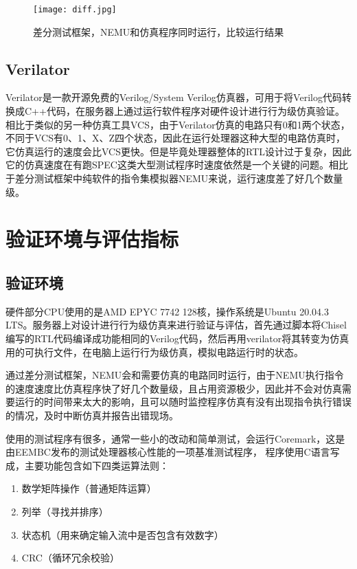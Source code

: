 \begin{figure}[htb]
	\centering
	\setlength\tabcolsep{3pt}  %
	\vspace{5pt} %
	\texttt{[image: diff.jpg]}
	\caption{差分测试框架，NEMU和仿真程序同时运行，比较运行结果}
	\label{fig:figure64}
\end{figure}

\subsection{Verilator}

Verilator\cite{verilator}是一款开源免费的Verilog/System Verilog仿真器，可用于将Verilog代码转换成C++代码，在服务器上通过运行软件程序对硬件设计进行行为级仿真验证。相比于类似的另一种仿真工具VCS\cite{vcs}，由于Verilator仿真的电路只有0和1两个状态，不同于VCS有0、1、X、Z四个状态，因此在运行处理器这种大型的电路仿真时，它仿真运行的速度会比VCS更快。但是毕竟处理器整体的RTL设计过于复杂，因此它的仿真速度在有跑SPEC这类大型测试程序时速度依然是一个关键的问题。相比于差分测试框架中纯软件的指令集模拟器NEMU来说，运行速度差了好几个数量级。

\section{验证环境与评估指标}

\subsection{验证环境}

硬件部分CPU使用的是AMD EPYC 7742 128核，操作系统是Ubuntu 20.04.3 LTS。服务器上对设计进行行为级仿真来进行验证与评估，首先通过脚本将Chisel编写的RTL代码编译成功能相同的Verilog代码，然后再用verilator将其转变为仿真用的可执行文件，在电脑上运行行为级仿真，模拟电路运行时的状态。

通过差分测试框架，NEMU会和需要仿真的电路同时运行，由于NEMU执行指令的速度速度比仿真程序快了好几个数量级，且占用资源极少，因此并不会对仿真需要运行的时间带来太大的影响，且可以随时监控程序仿真有没有出现指令执行错误的情况，及时中断仿真并报告出错现场。

使用的测试程序有很多，通常一些小的改动和简单测试，会运行Coremark，这是由EEMBC发布的测试处理器核心性能的一项基准测试程序，
程序使用C语言写成，主要功能包含如下四类运算法则：

\begin{enumerate}
	\item 数学矩阵操作（普通矩阵运算）
	\item 列举（寻找并排序）
	\item 状态机（用来确定输入流中是否包含有效数字）
	\item CRC（循环冗余校验）
\end{enumerate}

